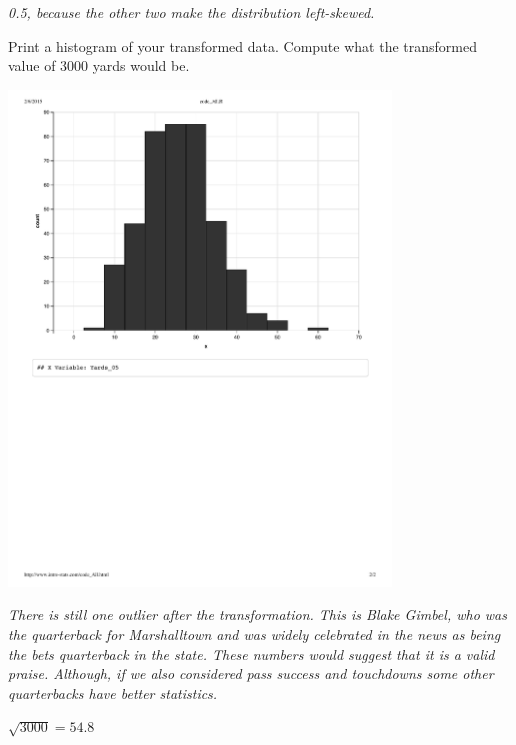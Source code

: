 \documentclass{article}[11pt]
\begin{document}
\begin{enumerate}
\begin{enumerate}
\hspace{1in} {\em 0.5, because the other two make the distribution left-skewed.} 

Print a histogram of your transformed data. Compute what the transformed value of 3000 yards would be. 

\includegraphics[width=4in]{hwk3-intRo2.pdf}

{\em There is still one outlier after the transformation. This is Blake Gimbel, who was the quarterback for Marshalltown and was widely celebrated in the news as being the bets quarterback in the state. These numbers would suggest that it is a valid praise. Although, if we also considered pass success and touchdowns some other quarterbacks have better statistics.}

{\em $\sqrt{3000} = 54.8$}

\end{enumerate}

\end{enumerate}
\end{document}
